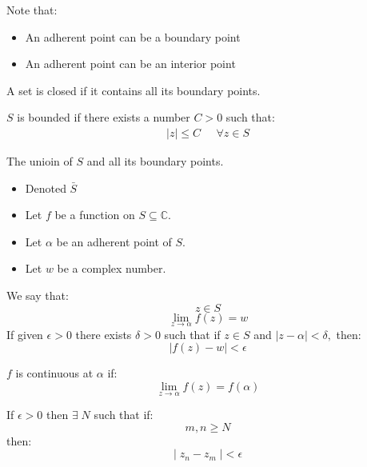 Note that:
\begin{itemize}
	\item An adherent point can be a boundary point
	\item An adherent point can be an interior point
\end{itemize}

\begin{defn}
	A set is closed if it contains all its boundary points.
\end{defn}

\begin{defn}
	$S$ is bounded if there exists a number $C > 0$ such that:
	\begin{align*}
		|z| \leq C \;\;\;\;\; \forall z \in S
	\end{align*}
\end{defn}

\begin{defn}
	The unioin of $S$ and all its boundary points.
	\begin{itemize}
		\item Denoted $\bar{S}$
	\end{itemize}
\end{defn}

\begin{defn}
	
\end{defn}
\begin{itemize}
	\item Let $f$ be a function on $S \subseteq \mathbb{C}.$ 
	\item Let $\alpha$ be an adherent point of $S.$ 
	\item Let $w$ be a complex number. 
\end{itemize}
We say that:
	\[ z \in S \]
	\[ \lim_{z \to \alpha} f(z) = w \]
If given $\epsilon > 0$ there exists $\delta > 0$ such that if $z \in S$ and $|z - \alpha| < \delta,$ then:
\[ |f(z) - w | < \epsilon \]

\begin{defn}
	$f$ is continuous at $\alpha$ if:
	\[ \lim_{z \to \alpha} f(z) = f(\alpha) \]
\end{defn} 

\begin{defn}
	If $\epsilon > 0$ then $\exists \; N$ such that if:
	\[ m, n \geq N \]
	then:
	\[| \; {z}_{n} - {z}_{m} \; | < \epsilon \]
\end{defn}


